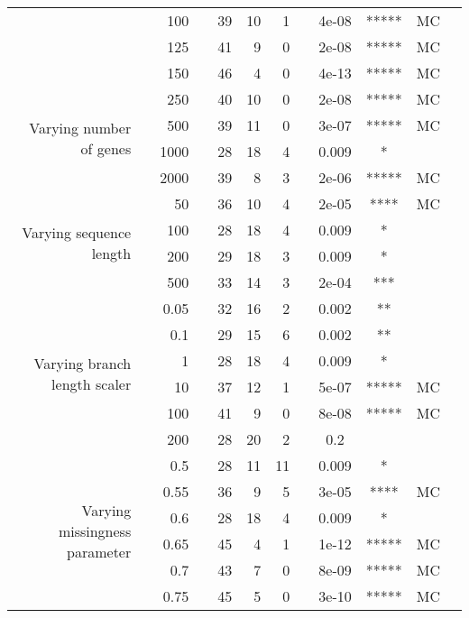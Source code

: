 \begin{table}[!h]
\begin{tabular}{r r r l r r r l c c c l}
   & & 100 & & 39 & 10 & 1 & & 4e-08 & ***** & MC &  \\
   & & 125 & & 41 & 9 & 0 & & 2e-08 & ***** & MC &  \\
   & & 150 & & 46 & 4 & 0 & & 4e-13 & ***** & MC &  \\
\midrule
\multirow{ 4}{2cm}{Varying number of genes}
   & & 250 & & 40 & 10 & 0 & & 2e-08 & ***** & MC &  \\
   & & 500 & & 39 & 11 & 0 & & 3e-07 & ***** & MC &  \\
   & & 1000 & & 28 & 18 & 4 & & 0.009 & * &  &  \\
   & & 2000 & & 39 & 8 & 3 & & 2e-06 & ***** & MC &  \\
\midrule
\multirow{ 4}{2cm}{Varying sequence length}
   & & 50 & & 36 & 10 & 4 & & 2e-05 & **** & MC &  \\
   & & 100 & & 28 & 18 & 4 & & 0.009 & * &  &  \\
   & & 200 & & 29 & 18 & 3 & & 0.009 & * &  &  \\
   & & 500 & & 33 & 14 & 3 & & 2e-04 & *** &  &  \\
\midrule
\multirow{ 6}{2cm}{Varying branch length scaler}
   & & 0.05 & & 32 & 16 & 2 & & 0.002 & ** &  &  \\
   & & 0.1 & & 29 & 15 & 6 & & 0.002 & ** &  &  \\
   & & 1 & & 28 & 18 & 4 & & 0.009 & * &  &  \\
   & & 10 & & 37 & 12 & 1 & & 5e-07 & ***** & MC &  \\
   & & 100 & & 41 & 9 & 0 & & 8e-08 & ***** & MC &  \\
   & & 200 & & 28 & 20 & 2 & & 0.2 &  &  &  \\
\midrule
\multirow{ 6}{2cm}{Varying missingness parameter}
   & & 0.5 & & 28 & 11 & 11 & & 0.009 & * &  &  \\
   & & 0.55 & & 36 & 9 & 5 & & 3e-05 & **** & MC &  \\
   & & 0.6 & & 28 & 18 & 4 & & 0.009 & * &  &  \\
   & & 0.65 & & 45 & 4 & 1 & & 1e-12 & ***** & MC &  \\
   & & 0.7 & & 43 & 7 & 0 & & 8e-09 & ***** & MC &  \\
   & & 0.75 & & 45 & 5 & 0 & & 3e-10 & ***** & MC &  \\
\bottomrule
\end{tabular}
\end{table}

